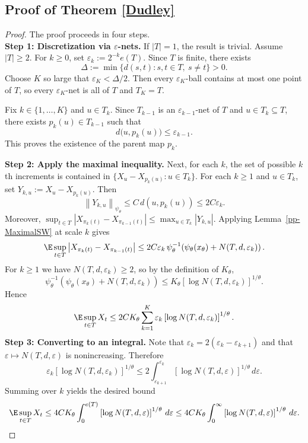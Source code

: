 \documentclass[11pt]{article}
\providecommand{\paren}[1]{\left(#1\right)}
\renewcommand{\norm}[1]{\left\|#1\right\|}
\renewcommand{\abs}[1]{\left|#1\right|}
\providecommand{\bracks}[1]{\left[#1\right]}
\begin{document}
\subsection{Proof of Theorem \ref{Dudley}}
\begin{proof}
The proof proceeds in four steps.\\
\medskip
\noindent\textbf{Step 1: Discretization via $\varepsilon$-nets.}
If $\abs{T}=1$, the result is trivial. Assume $\abs{T}\ge 2$. For $k\ge 0$, set
$\varepsilon_k:=2^{-k}e(T)$. Since $T$ is finite, there exists
\[
\Delta:=\min\{d(s,t):s,t\in T,\ s\neq t\}>0.
\]
Choose $K$ so large that $\varepsilon_K<\Delta/2$. Then every $\varepsilon_K$-ball contains at most one point of $T$, so every $\varepsilon_K$-net is all of $T$ and $T_K=T$.

Fix $k\in\{1,\dots,K\}$ and $u\in T_k$. Since $T_{k-1}$ is an
$\varepsilon_{k-1}$-net of $T$ and $u\in T_k\subseteq T$, there exists
$p_k(u)\in T_{k-1}$ such that
\[
d\bigl(u,p_k(u)\bigr)\le \varepsilon_{k-1}.
\]
This proves the existence of the parent map $p_k$.

\medskip
\noindent\textbf{Step 2: Apply the maximal inequality.}
Next, for each $k$, the set of possible $k$th increments is contained in
$
\bigl\{X_u-X_{p_k(u)}:u\in T_k\bigr\}$. For each $k\ge 1$ and $u\in T_k$, set $Y_{k,u}:=X_u-X_{p_k(u)}$. Then
\[
\norm{Y_{k,u}}_{\psi_\theta}\le C\,d\paren{u,p_k(u)}\le 2C\varepsilon_k.
\]
Moreover,
$
\sup_{t\in T}\abs{X_{\pi_k(t)}-X_{\pi_{k-1}(t)}}
\le
\max_{u\in T_k}\abs{Y_{k,u}}$. Applying Lemma~\ref{pp-MaximalSW} at scale $k$ gives
\[
\E\sup_{t\in T}\abs{X_{\pi_k(t)}-X_{\pi_{k-1}(t)}}
\le
2C\varepsilon_k\,
\psi_\theta^{-1}\!\paren{\psi_\theta(x_\theta)+N(T,d,\varepsilon_k)}.
\]
For $k\ge 1$ we have $N(T,d,\varepsilon_k)\ge 2$, so by the definition of $K_\theta$,
\[
\psi_\theta^{-1}\!\paren{\psi_\theta(x_\theta)+N(T,d,\varepsilon_k)}
\le
K_\theta \bracks{\log N(T,d,\varepsilon_k)}^{1/\theta}.
\]
Hence
\[
\E \sup_{t\in T} X_t
\le
2CK_\theta
\sum_{k=1}^K
\varepsilon_k \bracks{\log N(T,d,\varepsilon_k)}^{1/\theta}.
\]
\medskip
\noindent\textbf{Step 3: Converting to an integral.}
Note that $\varepsilon_k=2(\varepsilon_k-\varepsilon_{k+1})$ and that $\varepsilon\mapsto N(T,d,\varepsilon)$ is nonincreasing. Therefore
\[
\varepsilon_k \bracks{\log N(T,d,\varepsilon_k)}^{1/\theta}
\le
2\int_{\varepsilon_{k+1}}^{\varepsilon_k}
\bracks{\log N(T,d,\varepsilon)}^{1/\theta}\,d\varepsilon.
\]
Summing over $k$ yields the desired bound
\[
\E \sup_{t\in T} X_t
\le
4CK_\theta
\int_0^{e(T)}
\bracks{\log N(T,d,\varepsilon)}^{1/\theta}\,d\varepsilon
\le
4CK_\theta
\int_0^\infty
\bracks{\log N(T,d,\varepsilon)}^{1/\theta}\,d\varepsilon.
\]
\end{proof}
\end{document}
